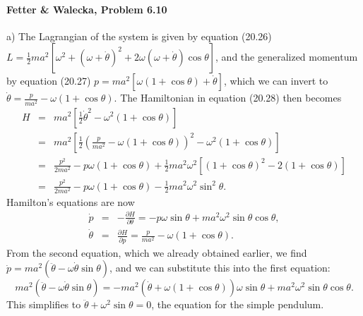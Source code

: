 \documentclass[letterpaper,11pt]{article}
\begin{document}
\paragraph*{Fetter \& Walecka, Problem 6.10}
a) The Lagrangian of the system is given by equation (20.26) $L = \frac{1}{2} ma^2 [\omega^2 + (\omega + \dot\theta)^2 + 2\omega(\omega + \dot\theta)\cos\theta]$, and the generalized momentum by equation (20.27) $p = ma^2 [\omega(1 + \cos\theta) + \dot\theta]$, which we can invert to $\dot\theta = \frac{p}{ma^2} - \omega (1+\cos\theta)$.  The Hamiltonian in equation (20.28) then becomes
\begin{eqnarray*}
 H & = & ma^2 \left[\frac{1}{2}\dot\theta^2 - \omega^2(1+\cos\theta)\right] \\
   & = & ma^2 \left[\frac{1}{2} \left(\frac{p}{ma^2} - \omega (1+\cos\theta)\right)^2 - \omega^2(1+\cos\theta)\right] \\
   & = & \frac{p^2}{2ma^2} - p \omega (1 + \cos\theta) + \frac{1}{2}ma^2\omega^2\left[ (1+\cos\theta)^2 - 2(1+\cos\theta)\right]  \\
   & = & \frac{p^2}{2ma^2} - p \omega (1 + \cos\theta) - \frac{1}{2}ma^2\omega^2 \sin^2\theta.
\end{eqnarray*}
Hamilton's equations are now
\begin{eqnarray*}
 \dot{p} & = & -\frac{\partial H}{\partial \theta} = - p \omega \sin\theta + ma^2 \omega^2 \sin\theta \cos\theta, \\
 \dot{\theta} & = & \frac{\partial H}{\partial p} = \frac{p}{ma^2} - \omega (1+\cos\theta).
\end{eqnarray*}
From the second equation, which we already obtained earlier, we find $\dot{p} = ma^2 (\ddot\theta - \omega \dot\theta \sin\theta)$, and we can substitute this into the first equation:
\begin{equation*}
 ma^2 (\ddot\theta - \omega \dot\theta \sin\theta) = - ma^2 \left(\dot\theta + \omega (1+\cos\theta) \right) \omega \sin\theta + ma^2 \omega^2 \sin\theta \cos\theta.
\end{equation*}
This simplifies to $\ddot\theta + \omega^2 \sin\theta = 0$, the equation for the simple pendulum.
\end{document}
